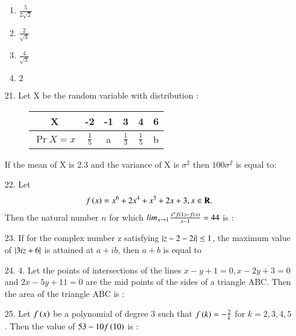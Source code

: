 \documentclass[journal,12pt,onecolumn]{IEEEtran}
\theoremstyle{remark}
\begin{document}
\begin{enumerate}
        \hfill{}
        \begin{enumerate}
            \item $\frac{5}{2\sqrt{2}}$ 
            \item $\frac{2}{\sqrt{3}}$ 
            \item $\frac{4}{\sqrt{3}}$  
            \item $2$
        \end{enumerate}
    \item[21.] Let X be the random variable with distribution : 
        \begin{figure}
            \centering
            \begin{tabular}[12pt]{ |c| c| c | c | c| c|}
                \hline
                X & -2 & -1 & 3 & 4 & 6\\ 
                \hline
                $\Pr{X = x}$  & $\frac{1}{5}$ & a & $\frac{1}{3}$ & $\frac{1}{5}$ & b \\
                \hline 
            \end{tabular}
        \end{figure}
        If the mean of X is 2.3 and the variance of X is $\sigma ^ 2$ then $100\sigma ^ 2$ is equal to:
        \hfill{}\\

    \item[22.] Let 
        \begin{align}
            f\left(x\right) = x^6 + 2x^4 + x^3 + 2x + 3, x \in \textbf{R}. 
        \end{align}
        Then the natural number $n$ for which $lim_{x \to 1} \frac{x^{n}f\left(1\right) - f\left(x\right)}{x - 1} = 44$ is :
        \hfill{}\\


    \item[23.] If for the complex number z satisfying $\left\vert z - 2 -2i\right\vert \le 1$, the maximum value of $\left\vert3iz + 6\right\vert$ is attained at $a + ib$, then $a + b$ is equal to
        \hfill{}\\


    \item[24.] 4. Let the points of intersections of the lines $x - y + 1 = 0, x -  2y + 3 = 0$ and $2x - 5y + 11 = 0$ are the mid points
        of the sides of a triangle ABC. Then the area of the triangle ABC is :
        \hfill{}\\


    \item[25.] Let $f\left(x\right)$  be a polynomial of degree 3 such that $f\left(k\right) = -\frac{2}{k}$ for $k = 2, 3, 4, 5$. Then the value of
        $53 - 10f\left(10\right)$ is :
        \hfill{}\\



\end{enumerate}
\end{document}

